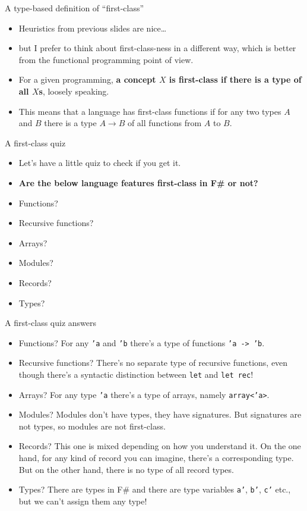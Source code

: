 \documentclass{beamer}
\newcommand{\m}[1]{\texttt{#1}}
\begin{document}
\begin{frame}{A type-based definition of ``first-class''}
\begin{itemize}
	\item Heuristics from previous slides are nice\dots
	\item but I prefer to think about first-class-ness in a different way, which is better from the functional programming point of view.
	\item For a given programming, \textbf{a concept $X$ is first-class if there is a type of all $X$s}, loosely speaking.
	\item This means that a language has first-class functions if for any two types $A$ and $B$ there is a type $A \to B$ of all functions from $A$ to $B$.
\end{itemize}
\end{frame}

\begin{frame}{A first-class quiz}
\begin{itemize}
	\item Let's have a little quiz to check if you get it.
	\item \textbf{Are the below language features first-class in F\# or not?}
	\item Functions?
	\item Recursive functions?
	\item Arrays?
	\item Modules?
	\item Records?
	\item Types?
\end{itemize}
\end{frame}

\begin{frame}{A first-class quiz answers}
\begin{itemize}
	\color{green} \item Functions? \color{black} For any \m{'a} and \m{'b} there's a type of functions \m{'a -> 'b}.
	\color{red} \item Recursive functions? \color{black} There's no separate type of recursive functions, even though there's a syntactic distinction between \m{let} and \m{let rec}!
	\color{green} \item Arrays? \color{black} For any type \m{'a} there's a type of arrays, namely \m{array<'a>}.
	\color{red} \item Modules? \color{black} Modules don't have types, they have signatures. But signatures are not types, so modules are not first-class.
	\color{yellow}\item Records? \color{black} This one is mixed depending on how you understand it. On the one hand, for any kind of record you can imagine, there's a corresponding type. But on the other hand, there is no type of all record types.
	\color{red} \item Types? \color{black} There are types in F\# and there are type variables \m{a'}, \m{b'}, \m{c'} etc., but we can't assign them any type!
\end{itemize}
\end{frame}
\end{document}
